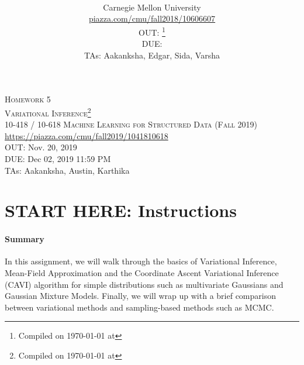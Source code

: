 \documentclass[11pt,addpoints,answers]{exam}
\title{\textsc{\hwName}} %
\author{\courseName\\
  Carnegie Mellon University \\
\url{piazza.com/cmu/fall2018/10606607} \\
OUT: \outDate{}\thanks{Compiled on \today{} at \currenttime{}} \\
DUE: \dueDate{} \\ 
TAs: Aakanksha, Edgar, Sida, Varsha}
\date{}
\date{}
\numberwithin{equation}{section} %
\numberwithin{figure}{section} %
\numberwithin{table}{section} %
\newcommand{\courseNum}{10-418 / 10-618}
\newcommand{\courseName}{Machine Learning for Structured Data}
\newcommand{\courseSem}{Fall 2019}
\newcommand{\piazzaUrl}{\url{https://piazza.com/cmu/fall2019/1041810618}}
\newcommand{\hwNum}{Homework 5}
\newcommand{\hwTopic}{Variational Inference}
\newcommand{\outDate}{Nov. 20, 2019}
\newcommand{\dueDate}{Dec 02, 2019 11:59 PM}
\newcommand{\taNames}{Aakanksha, Austin, Karthika}
\begin{document}
\section*{}
\begin{center}
  \textsc{\LARGE \hwNum} \\
  \textsc{\LARGE \hwTopic\footnote{Compiled on \today{} at \currenttime{}}} \\
  \vspace{1em}
  \textsc{\large \courseNum{} \courseName{} (\courseSem)} \\
  \piazzaUrl\\
  \vspace{1em}
  OUT: \outDate \\
  DUE: \dueDate \\
  TAs: \taNames
\end{center}


\section*{START HERE: Instructions}

\begin{notebox}
\paragraph{Summary} In this assignment, we will walk through the basics of Variational Inference, Mean-Field Approximation and the Coordinate Ascent Variational Inference (CAVI) algorithm for simple distributions such as multivariate Gaussians and Gaussian Mixture Models. Finally, we will wrap up with a brief comparison between variational methods and sampling-based methods such as MCMC.
\end{notebox}
\end{document}
